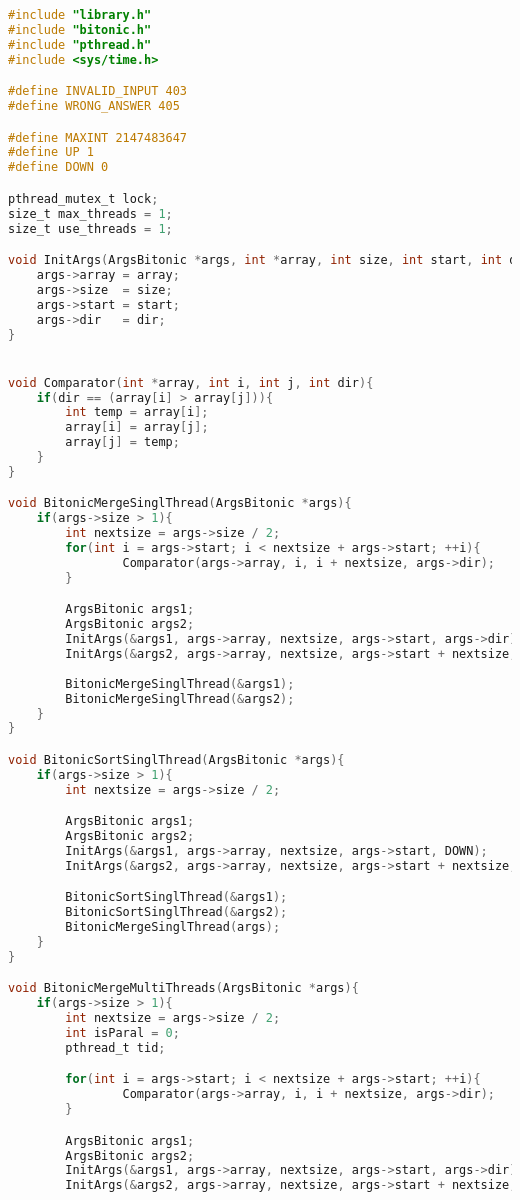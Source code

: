 \documentclass[pdf, unicode, 12pt, a4paper,oneside,fleqn]{article}
\begin{document}
\begin{lstlisting}[language=C]
#include "library.h"
#include "bitonic.h"
#include "pthread.h"
#include <sys/time.h>

#define INVALID_INPUT 403
#define WRONG_ANSWER 405

#define MAXINT 2147483647
#define UP 1
#define DOWN 0

pthread_mutex_t lock;
size_t max_threads = 1;
size_t use_threads = 1;

void InitArgs(ArgsBitonic *args, int *array, int size, int start, int dir){
    args->array = array;
    args->size  = size;
    args->start = start;
    args->dir   = dir;
}


void Comparator(int *array, int i, int j, int dir){
    if(dir == (array[i] > array[j])){
        int temp = array[i];
        array[i] = array[j];
        array[j] = temp;
    }
}

void BitonicMergeSinglThread(ArgsBitonic *args){
    if(args->size > 1){
        int nextsize = args->size / 2;
        for(int i = args->start; i < nextsize + args->start; ++i){
                Comparator(args->array, i, i + nextsize, args->dir);
        }

        ArgsBitonic args1;
        ArgsBitonic args2;
        InitArgs(&args1, args->array, nextsize, args->start, args->dir);
        InitArgs(&args2, args->array, nextsize, args->start + nextsize, args->dir);
        
        BitonicMergeSinglThread(&args1);
        BitonicMergeSinglThread(&args2);
    }
}

void BitonicSortSinglThread(ArgsBitonic *args){
    if(args->size > 1){
        int nextsize = args->size / 2;

        ArgsBitonic args1;
        ArgsBitonic args2;
        InitArgs(&args1, args->array, nextsize, args->start, DOWN);
        InitArgs(&args2, args->array, nextsize, args->start + nextsize, UP);

        BitonicSortSinglThread(&args1);
        BitonicSortSinglThread(&args2);
        BitonicMergeSinglThread(args);
    }
}

void BitonicMergeMultiThreads(ArgsBitonic *args){
    if(args->size > 1){        
        int nextsize = args->size / 2;
        int isParal = 0;
        pthread_t tid;

        for(int i = args->start; i < nextsize + args->start; ++i){
                Comparator(args->array, i, i + nextsize, args->dir);
        }

        ArgsBitonic args1;
        ArgsBitonic args2;
        InitArgs(&args1, args->array, nextsize, args->start, args->dir);
        InitArgs(&args2, args->array, nextsize, args->start + nextsize, args->dir);


\end{lstlisting}
\end{document}
